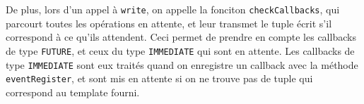 \documentclass[a4paper,12pt]{article}
\begin{document}
De plus, lors d'un appel à \texttt{write}, on appelle la fonciton \texttt{checkCallbacks}, qui parcourt toutes les opérations en attente, et leur transmet le tuple écrit s'il correspond à ce qu'ils attendent.
Ceci permet de prendre en compte les callbacks de type \texttt{FUTURE}, et ceux du type \texttt{IMMEDIATE} qui sont en attente.
Les callbacks de type \texttt{IMMEDIATE} sont eux traités quand on enregistre un callback avec la méthode \texttt{eventRegister}, et sont mis en attente si on ne trouve pas de tuple qui correspond au template fourni.
\end{document}
